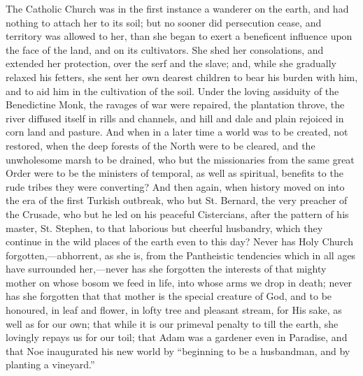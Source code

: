 The Catholic Church was in the
first instance a wanderer on the earth, and had nothing to attach her
to its soil; but no sooner did persecution cease, and territory was
allowed to her, than she began to exert a beneficent influence upon
the face of the land, and on its cultivators. She shed her
consolations, and extended her protection, over the serf and the
slave; and, while she gradually relaxed his fetters, she sent her own
dearest children to bear his burden with him, and to aid him in the
cultivation of the soil. Under the loving assiduity of the Benedictine
Monk, the ravages of war were repaired, the plantation throve, the
river diffused itself in rills and channels, and hill and dale and
plain rejoiced in corn land and pasture. And when in a later time a
world was to be created, not restored, when the deep forests of the
North were to be cleared, and the unwholesome marsh to be drained, who
but the missionaries from the same great Order were to be the
ministers of temporal, as well as spiritual, benefits to the rude
tribes they were converting? And then again, when history moved on
into the era of the first Turkish outbreak, who but St. Bernard, the
very preacher of the Crusade, who but he led on his peaceful
Cistercians, after the pattern of his master, St. Stephen, to that
laborious but cheerful husbandry, which they continue in the wild
places of the earth even to this day? Never has Holy Church
forgotten,—abhorrent, as she is, from the Pantheistic tendencies
which in all ages have surrounded her,—never has she forgotten the
interests of that mighty mother on whose bosom we feed in life, into whose arms we drop in death; never has she forgotten that that
mother is the special creature of God, and to be honoured, in leaf and
flower, in lofty tree and pleasant stream, for His sake, as well as
for our own; that while it is our primeval penalty to till the earth,
she lovingly repays us for our toil; that Adam was a gardener even in
Paradise, and that Noe inaugurated his new world by ``beginning to be a
husbandman, and by planting a vineyard.''

